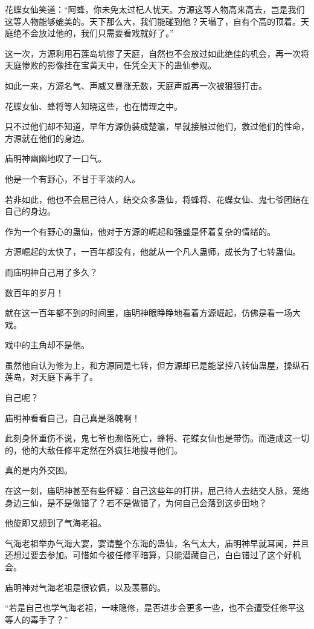 \begin{this_body}
花蝶女仙笑道：“阿蜂，你未免太过杞人忧天。方源这等人物高来高去，岂是我们这等人物能够媲美的。天下那么大，我们能碰到他？天塌了，自有个高的顶着。天庭绝不会放过他的，我们只需要看戏就好了。”

这一次，方源利用石莲岛坑惨了天庭，自然也不会放过如此绝佳的机会，再一次将天庭惨败的影像挂在宝黄天中，任凭全天下的蛊仙参观。

如此一来，方源名气、声威又暴涨无数，天庭声威再一次被狠狠打击。

花蝶女仙、蜂将等人知晓这些，也在情理之中。

只不过他们却不知道，早年方源伪装成楚瀛，早就接触过他们，救过他们的性命，方源就在他们的身边。

庙明神幽幽地叹了一口气。

他是一个有野心，不甘于平淡的人。

若非如此，他也不会屈己待人，结交众多蛊仙，将蜂将、花蝶女仙、鬼七爷团结在自己的身边。

作为一个有野心的蛊仙，他对于方源的崛起和强盛是怀着复杂的情绪的。

方源崛起的太快了，一百年都没有，他就从一个凡人蛊师，成长为了七转蛊仙。

而庙明神自己用了多久？

数百年的岁月！

就在这一百年都不到的时间里，庙明神眼睁睁地看着方源崛起，仿佛是看一场大戏。

戏中的主角却不是他。

虽然他自认为修为上，和方源同是七转，但方源却已是能掌控八转仙蛊屋，操纵石莲岛，对天庭下毒手了。

自己呢？

庙明神看看自己，自己真是落魄啊！

此刻身怀重伤不说，鬼七爷也濒临死亡，蜂将、花蝶女仙也是带伤。而造成这一切的，他的大敌任修平定然在外疯狂地搜寻他们。

真的是内外交困。

在这一刻，庙明神甚至有些怀疑：自己这些年的打拼，屈己待人去结交人脉，笼络身边三仙，是不是做错了？若不是做错了，为何自己会落到这步田地？

他旋即又想到了气海老祖。

气海老祖举办气海大宴，宴请整个东海的蛊仙，名气太大，庙明神早就耳闻，并且还想过要去参加。可惜如今被任修平暗算，只能潜藏自己，白白错过了这个好机会。

庙明神对气海老祖是很钦佩，以及羡慕的。

“若是自己也学气海老祖，一味隐修，是否进步会更多一些，也不会遭受任修平这等人的毒手了？”


\end{this_body}

